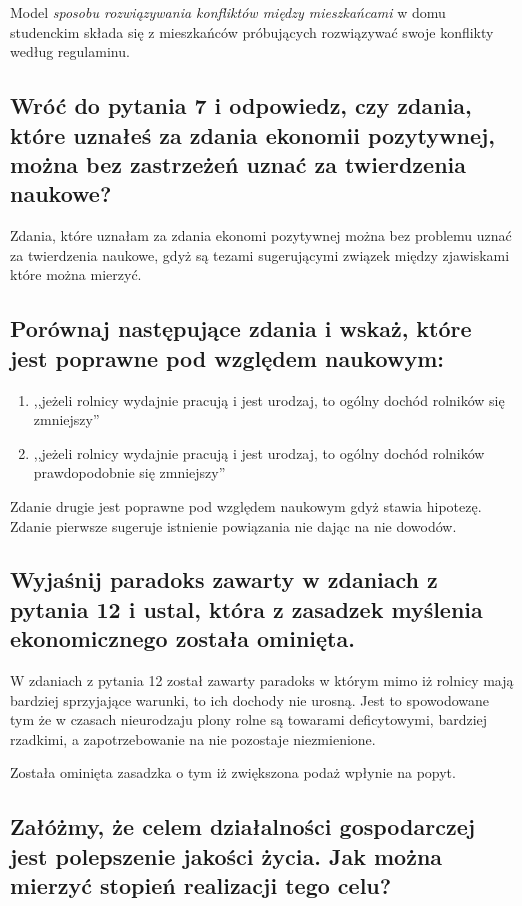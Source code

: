 \documentclass[a4paper,12pt]{article}
\begin{document}
Model \emph{sposobu rozwiązywania konfliktów między mieszkańcami} w domu studenckim składa się z mieszkańców próbujących rozwiązywać swoje konflikty według regulaminu.

\subsection{Wróć do pytania 7 i odpowiedz, czy zdania, które uznałeś za zdania ekonomii pozytywnej, można bez zastrzeżeń uznać za twierdzenia naukowe?}

Zdania, które uznałam za zdania ekonomi pozytywnej można bez problemu uznać za twierdzenia naukowe, gdyż są tezami sugerującymi związek między zjawiskami które można mierzyć.

\subsection{Porównaj następujące zdania i wskaż, które jest poprawne pod względem naukowym:}


\begin{enumerate}
	\item ,,jeżeli rolnicy wydajnie pracują i jest urodzaj, to ogólny dochód rolników się zmniejszy''

	\item ,,jeżeli rolnicy wydajnie pracują i jest urodzaj, to ogólny dochód rolników prawdopodobnie się zmniejszy''
\end{enumerate}

Zdanie drugie jest poprawne pod względem naukowym gdyż stawia hipotezę. Zdanie pierwsze sugeruje istnienie powiązania nie dając na nie dowodów.

\subsection{Wyjaśnij paradoks zawarty w zdaniach z pytania 12 i ustal, która z zasadzek myślenia ekonomicznego została ominięta.}

W zdaniach z pytania 12 został zawarty paradoks w którym mimo iż rolnicy mają bardziej sprzyjające warunki, to ich dochody nie urosną. Jest to spowodowane tym że w czasach nieurodzaju plony rolne są towarami deficytowymi, bardziej rzadkimi, a zapotrzebowanie na nie pozostaje niezmienione.

Została ominięta zasadzka o tym iż zwiększona podaż wpłynie na popyt.

\subsection{Załóżmy, że celem działalności gospodarczej jest polepszenie jakości życia. Jak można mierzyć stopień realizacji tego celu?}
\end{document}
